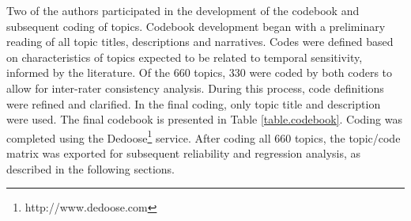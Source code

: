 \documentclass{sig-alternate}
\begin{document}
Two of the authors participated in the development of the codebook and subsequent coding of topics. Codebook development began with a preliminary reading of all topic titles, descriptions and narratives. Codes were defined based on characteristics of topics expected to be related to temporal sensitivity, informed by the literature. Of the 660 topics, 330 were coded by both coders to allow for inter-rater consistency analysis. During this process, code definitions were refined and clarified. In the final coding, only topic title and description were used. The final codebook is presented in Table \ref{table.codebook}. Coding was completed using the Dedoose\footnote{http://www.dedoose.com} service.  After coding all 660 topics, the topic/code matrix was exported for subsequent reliability and regression analysis, as described in the following sections. 
\end{document}
